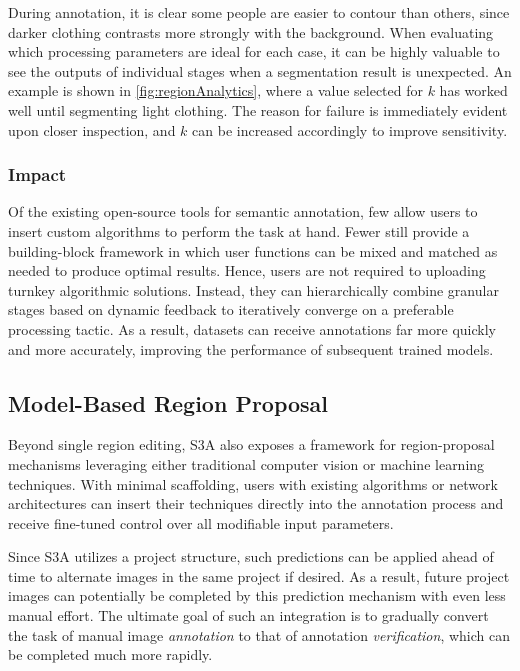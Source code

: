\makeSparsePeopleFig

During annotation, it is clear some people are easier to contour than others, since darker clothing contrasts more strongly with the background. When evaluating which processing parameters are ideal for each case, it can be highly valuable to see the outputs of individual stages when a segmentation result is unexpected. An example is shown in \autoref{fig:regionAnalytics}, where a value selected for $k$ has worked well until segmenting light clothing. The reason for failure is immediately evident upon closer inspection, and $k$ can be increased accordingly to improve sensitivity.

\makeRegionAnalyticsFig

\subsubsection{Impact}
Of the existing open-source tools for semantic annotation, few allow users to insert custom algorithms to perform the task at hand. Fewer still provide a building-block framework in which user functions can be mixed and matched as needed to produce optimal results. Hence, users are not required to uploading turnkey algorithmic solutions. Instead, they can hierarchically combine granular stages based on dynamic feedback to iteratively converge on a preferable processing tactic. As a result, datasets can receive annotations far more quickly and more accurately, improving the performance of subsequent trained models.

\subsection{Model-Based Region Proposal}\label{sec:rpnFramework}

Beyond single region editing, S3A also exposes a framework for region-proposal mechanisms leveraging either traditional computer vision or machine learning techniques. With minimal scaffolding, users with existing algorithms or network architectures can insert their techniques directly into the annotation process and receive fine-tuned control over all modifiable input parameters.

Since S3A utilizes a project structure, such predictions can be applied ahead of time to alternate images in the same project if desired. As a result, future project images can potentially be completed by this prediction mechanism with even less manual effort. The ultimate goal of such an integration is to gradually convert the task of manual image \emph{annotation} to that of annotation \emph{verification}, which can be completed much more rapidly.

